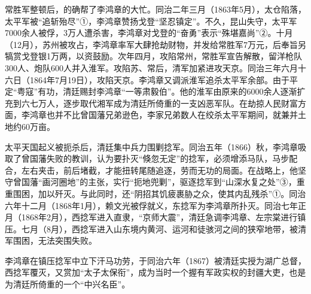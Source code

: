 \documentclass[10pt,a4paper]{beamer} %
\begin{document}
	\begin{frame}
		
		
		常胜军整顿后，的确帮了李鸿章的大忙。同治二年三月（1863年5月），太仓陷落，太平军被“追斩殆尽”①，李鸿章赞扬戈登“坚忍镇定”。不久，昆山失守，太平军7000余人被俘，3万人遭杀害，李鸿章对戈登的“奋勇”表示“殊堪嘉尚”②。十月（12月），苏州被攻占，李鸿章率军大肆抢劫财物，并发给常胜军7万元，后奉旨另犒赏戈登银1万两，以资鼓励。次年四月，攻陷常州，常胜军宣告解散，留洋枪队300人、炮队600人并入淮军。攻陷苏、常后，清军加紧进攻天京。同治三年六月十六日（1864年7月19日），攻陷天京。李鸿章又调派淮军追杀太平军余部。由于平定“粤寇”有功，清廷赐封李鸿章“一等肃毅伯”。他的淮军由原来的6000余人逐渐扩充到六七万人，逐步取代湘军成为清廷所倚重的一支凶恶军队。在劫掠人民财富方面，李鸿章也并不比曾国藩兄弟逊色，李家兄弟数人在绞杀太平军期间，就兼并土地约60万亩。
		
		太平天国起义被扼杀后，清廷集中兵力围剿捻军。同治五年（1866）秋，李鸿章吸取了曾国藩失败的教训，认为要扑灭“倏忽无定”的捻军，必须增添马队，马步配合，左右夹击，前后堵截，才能扭转尾随追逐，劳而无功的局面。在战略上，他坚守曾国藩“画河圈地”的主张，实行“扼地兜剿”，驱逐捻军到“山深水复之处”③，重重围困，加以歼灭。与此同时，还“阴招其饥疲裹胁之众，使其内乱残杀”①。同治六年十二月（1868年1月），赖文光被俘就义，东捻军为李鸿章所扑灭。同治七年正月（1868年2月），西捻军进入直隶，“京师大震”，清廷急调李鸿章、左宗棠进行镇压。七月（8月），西捻军进入山东境内黄河、运河和徒骇河之间的狭窄地带，被清军围困，无法突围失败。
		
		李鸿章在镇压捻军中立下汗马功劳，于同治六年（1867）被清廷实授为湖广总督，西捻军覆灭，又赏加“太子太保衔”，成为当时一个握有军政实权的封疆大吏，也是为清廷所倚重的一个“中兴名臣”。
	\end{frame}
\end{document}
